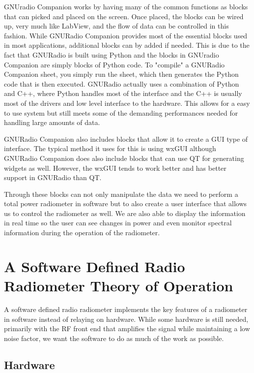 GNUradio Companion works by having many of the common functions as blocks that can picked and placed on the screen.  Once placed, the blocks can be wired up, very much like LabView, and the flow of data can be controlled in this fashion.  While GNURadio Companion provides most of the essential blocks used in most applications, additional blocks can by added if needed.  This is due to the fact that GNURadio is built using Python and the blocks in GNUradio Companion are simply blocks of Python code.  To "compile" a GNURadio Companion sheet, you simply run the sheet, which then generates the Python code that is then executed.  GNURadio actually uses a combination of Python and C++, where Python handles most of the interface and the C++ is usually most of the drivers and low level interface to the hardware.  This allows for a easy to use system but still meets some of the demanding performances needed for handling large amounts of data.  

GNURadio Companion also includes blocks that allow it to create a GUI type of interface.  The typical method it uses for this is using wxGUI although GNURadio Companion does also include blocks that can use QT for generating widgets as well.  However, the wxGUI tends to work better and has better support in GNURadio than QT.  

Through these blocks can not only manipulate the data we need to perform a total power radiometer in software but to also create a user interface that allows us to control the radiometer as well.  We are also able to display the information in real time so the user can see changes in power and even monitor spectral information during the operation of the radiometer. 

\section{A Software Defined Radio Radiometer Theory of Operation}
A software defined radio radiometer implements the key features of a radiometer in software instead of relaying on hardware.  While some hardware is still needed, primarily with the RF front end that amplifies the signal while maintaining a low noise factor, we want the software to do as much of the work as possible.  

\subsection{Hardware}

